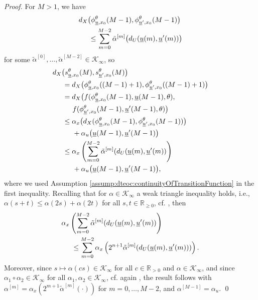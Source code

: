 \documentclass[letterpaper, 10 pt, conference]{IEEEconf}  %
\newcommand{\Rnn}{\mathbb{R}_{\geq 0}} %
\newcommand{\Rp}{\mathbb{R}_{>0}} %
\newcommand{\cKi}{\mathcal{K}_\infty} %
\newcommand{\s}{\phi} %
\newcommand{\is}[1]{{\underline{#1}}} %
\theoremstyle{theorem}
\theoremstyle{definition}
\theoremstyle{remark}
\begin{document}
\begin{proof}
For $M>1$, we have 
\begin{align*}
     & d_X \big(\s_{\is{u},x_0}^\theta(M-1),\s_{\is{u}',x_0}^\theta(M-1) \big) \\
    & \hspace{0.5cm} \leq \sum_{m=0}^{M-2} \tilde\alpha^{[m]} \big(d_U(\is{u}(m),\is{u}'(m)) \big)
\end{align*}
for some $\tilde\alpha^{[0]},\ldots,\tilde\alpha^{[M-2]}\in\cKi$, so
\begin{align*}
     & d_X \big( s_{\is{u},x_0}^\theta(M), s_{\is{u}',x_0}^\theta(M) \big) \\
     & \hspace{0.5cm} =  d_X \big(\s_{\is{u},x_0}^\theta((M-1)+1), \s_{\is{u}',x_0}^\theta((M-1)+1) \big) \\
        & \hspace{0.5cm}= d_X \big(f(\s_{\is{u},x_0}^\theta(M-1),\is{u}(M-1),\theta), \\
            & \hspace{1cm} f(\s_{\is{u}',x_0}^\theta(M-1),\is{u}'(M-1),\theta) \big) \\
        & \hspace{0.5cm}\leq \alpha_x\big(d_X(\s_{\is{u},x_0}^\theta(M-1), \s_{\is{u}',x_0}^\theta(M-1))\big) \\
            & \hspace{1cm} + \alpha_u \big( \is{u}(M-1),\is{u}'(M-1) \big) \\
        & \hspace{0.5cm}\leq \alpha_x\left(\sum_{m=0}^{M-2} \tilde\alpha^{[m]}(d_U(\is{u}(m),\is{u}'(m)) \right) \\
            & \hspace{1cm} + \alpha_u \big( \is{u}(M-1),\is{u}'(M-1) \big),
\end{align*}
where we used Assumption \ref{assump:dteoc:continuityOfTransitionFunction} in the first inequality.
Recalling that for $\alpha\in\cKi$ a weak triangle inequality holds, i.e., $\alpha(s+t)\leq\alpha(2s) + \alpha(2t)$ for all $s,t\in\Rnn$, cf. \cite[Equation~(8)]{kellett2014compendium}, then
\begin{align*}
    & \alpha_x\left(\sum_{m=0}^{M-2} \tilde\alpha^{[m]}(d_U(\is{u}(m),\is{u}'(m)) \right) \\
    & \hspace{0.5cm} \leq \sum_{m=0}^{M-2} \alpha_x\left(2^{n+1}\tilde\alpha^{[m]}(d_U(\is{u}(m),\is{u}'(m)))\right).
\end{align*}
Moreover, since $s \mapsto \alpha(c s) \in \cKi$ for all $c\in\Rp$ and $\alpha\in\cKi$, and since $\alpha_1 \circ \alpha_2 \in \cKi$ for all $\alpha_1,\alpha_2\in\cKi$, cf. again \cite{kellett2014compendium}, 
the result follows with $\alpha^{[m]}=\alpha_x\left(2^{m+1}\tilde\alpha^{[m]}(\cdot)\right)$ for $m=0,\ldots,M-2$,
and $\alpha^{[M-1]}=\alpha_u$.
\qed
\end{proof}
\end{document}
